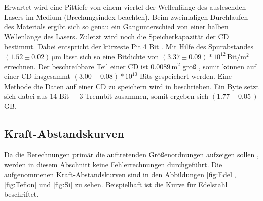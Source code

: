 Erwartet wird eine Pittiefe von einem viertel der Wellenlänge des auslesenden Lasers im Medium (Brechungsindex beachten).
Beim zweimaligen Durchlaufen des Materials ergibt sich so genau ein Gangunterschied von einer halben Wellenlänge des Lasers.
Zuletzt wird noch die Speicherkapazität der CD bestimmt. Dabei entspricht der kürzeste Pit 4 Bit \cite{anleitung}. Mit Hilfe des Spurabstandes 
$(1.52\pm0.02)\,\si{\micro\meter}$ lässt sich so eine Bitdichte von $(3.37\pm0.09)*10^{12}\,\text{Bit}/\si{\meter\squared}$ errechnen. Der beschreibbare Teil einer CD ist $0.0089\,\si{\meter\squared}$ groß \cite{CD_Größe}, somit können auf einer CD
insgesammt $(3.00\pm0.08)*10^{10}$ Bits gespeichert werden. Eine Methode die Daten auf einer CD zu speichern wird in \cite{anleitung} beschrieben.
Ein Byte setzt sich dabei aus 
14 Bit + 3 Trennbit zusammen, somit ergeben sich $(1.77\pm0.05\,)$GB.


\subsection{Kraft-Abstandskurven}

Da die Berechnungen primär die auftretenden Größenordnungen aufzeigen sollen \cite{anleitung},
werden in diesem Abschnitt keine Fehlerrechnungen durchgeführt.
Die aufgenommenen Kraft-Abstandskurven sind in den Abbildungen \ref{fig:Edel}, \ref{fig:Teflon} und \ref{fig:Si} zu sehen.
Beispielhaft ist die Kurve für Edelstahl beschriftet. 

